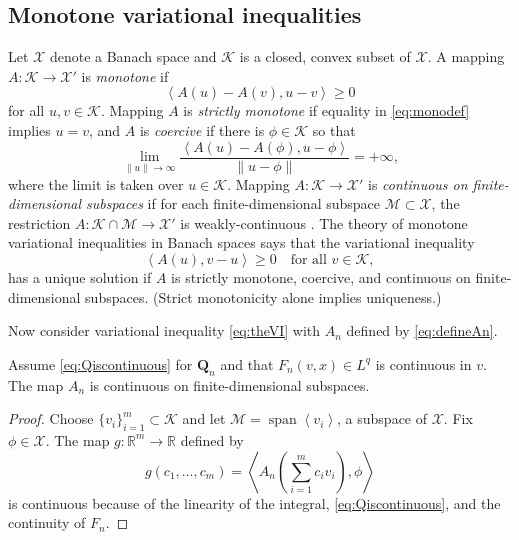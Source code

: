 \documentclass[final,leqno,onefignum,onetabnum]{siamltex1213bueler}
\newcommand\bQ{\mathbf{Q}}
\newcommand{\ip}[2]{\ensuremath{\left<#1,#2\right>}}
\newcommand\RR{\mathbb{R}}
\begin{document}
\subsection{Monotone variational inequalities} \label{subsec:mono}  Let $\mathcal{X}$ denote a Banach space and $\mathcal{K}$ is a closed, convex subset of $\mathcal{X}$.  A mapping $A : \mathcal{K} \to \mathcal{X}'$ is \emph{monotone} \cite{KinderlehrerStampacchia1980} if
\begin{equation}
   \ip{A(u) - A(v)}{u-v} \ge 0  \label{eq:monodef}
\end{equation}
for all $u,v\in\mathcal{K}$.  Mapping $A$ is \emph{strictly monotone} if equality in \eqref{eq:monodef} implies $u=v$, and $A$ is \emph{coercive} \cite{KinderlehrerStampacchia1980} if there is $\phi\in \mathcal{K}$ so that
\begin{equation}
   \lim_{\|u\|\to\infty} \frac{\ip{A(u) - A(\phi)}{u-\phi}}{\|u-\phi\|} = +\infty, \label{eq:coercivedef}
\end{equation}
where the limit is taken over $u\in\mathcal{K}$.  Mapping $A : \mathcal{K} \to \mathcal{X}'$ is \emph{continuous on finite-dimensional subspaces} if for each finite-dimensional subspace $\mathcal{M} \subset \mathcal{X}$, the restriction $A : \mathcal{K}\cap \mathcal{M} \to \mathcal{X}'$ is weakly-continuous \cite{KinderlehrerStampacchia1980}.  The theory of monotone variational inequalities in Banach spaces \cite[chapter III]{KinderlehrerStampacchia1980} says that the variational inequality
\begin{equation}
    \ip{A(u)}{v-u} \ge 0 \quad \text{for all $v\in\mathcal{K}$}, \label{eq:VIabstract}
\end{equation}
has a unique solution if $A$ is strictly monotone, coercive, and continuous on finite-dimensional subspaces.  (Strict monotonicity alone implies uniqueness.)

Now consider variational inequality \eqref{eq:theVI} with $A_n$ defined by \eqref{eq:defineAn}.

\begin{lemma}  \label{lem:continuous}  Assume \eqref{eq:Qiscontinuous} for $\bQ_n$ and that $F_n(v,x)\in L^q$ is continuous in $v$.  The map $A_n$ is continuous on finite-dimensional subspaces.
\end{lemma}

\begin{proof} Choose $\{v_i\}_{i=1}^m \subset \mathcal{K}$ and let $\mathcal{M}=\operatorname{span}\left<v_i\right>$, a subspace of $\mathcal{X}$.  Fix $\phi\in\mathcal{X}$.  The map $g:\RR^m \to \RR$ defined by
\begin{equation}
  g(c_1,\dots,c_m) = \ip{A_n\left(\sum_{i=1}^m c_i v_i\right)}{\phi}
\end{equation}
is continuous because of the linearity of the integral, \eqref{eq:Qiscontinuous}, and the continuity of $F_n$.
\end{proof}
\end{document}
